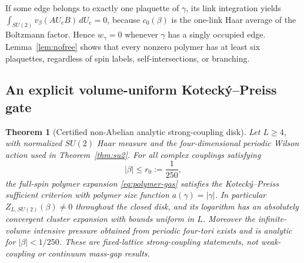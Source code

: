 \documentclass[11pt,a4paper]{article}
\newtheorem{theorem}{Theorem}
\begin{document}
If some edge belongs to exactly one plaquette of $\gamma$, its
link integration yields
$\int_{SU(2)}v_\beta(AU_eB)\,dU_e=0$,
because $c_0(\beta)$ is the one-link Haar average of the
Boltzmann factor. Hence $w_\gamma=0$ whenever $\gamma$ has
a singly occupied edge. Lemma~\ref{lem:nofree} shows that
every nonzero polymer has at least six plaquettes, regardless
of spin labels, self-intersections, or branching.

\subsection{An explicit volume-uniform Koteck\'y--Preiss gate}
\begin{theorem}[Certified non-Abelian analytic strong-coupling disk]
\label{thm:kp}
Let $L\ge4$, with normalized $SU(2)$ Haar measure and
the four-dimensional periodic Wilson action used in
Theorem~\ref{thm:su2}. For all complex couplings satisfying
\begin{equation}\label{eq:radius}
 |\beta|\le r_0:=\frac1{250},
\end{equation}
the full-spin polymer expansion \eqref{eq:polymer-gas}
satisfies the Koteck\'y--Preiss sufficient criterion
with polymer size function $a(\gamma)=|\gamma|$.
In particular $Z_{L,SU(2)}(\beta)\ne0$ throughout the
closed disk, and its logarithm has an absolutely convergent
cluster expansion with bounds uniform in $L$.
Moreover the infinite-volume intensive pressure obtained
from periodic four-tori exists and is analytic for
$|\beta|<1/250$. These are fixed-lattice strong-coupling
statements, not weak-coupling or continuum mass-gap results.
\end{theorem}
\end{document}
